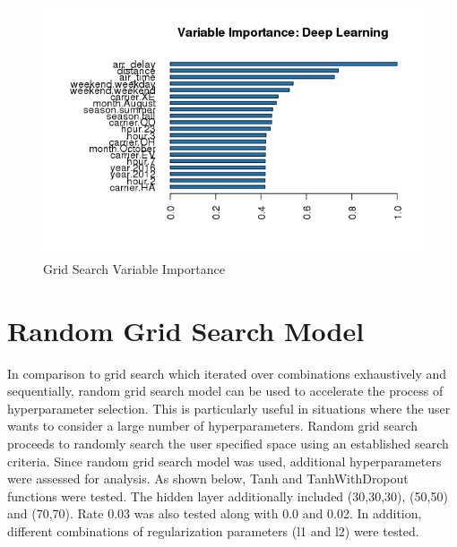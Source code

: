 \documentclass[12pt,twoside]{amherstthesis}
\begin{document}
  \begin{figure}[htbp]
  \centering
  \includegraphics[scale = 1,angle = 0]{figure/VarImportDeep-3.png}
  \caption[Grid Search Variable Importance]{\normalsize{Grid Search Variable Importance}}
  \label{fig:Hyarn89}
  \end{figure}
  
  \clearpage 
  
  \section{Random Grid Search Model}\label{random-grid-search-model}
  
  In comparison to grid search which iterated over combinations
  exhaustively and sequentially, random grid search model can be used to
  accelerate the process of hyperparameter selection. This is particularly
  useful in situations where the user wants to consider a large number of
  hyperparameters. Random grid search proceeds to randomly search the user
  specified space using an established search criteria. Since random grid
  search model was used, additional hyperparameters were assessed for
  analysis. As shown below, Tanh and TanhWithDropout functions were
  tested. The hidden layer additionally included (30,30,30), (50,50) and
  (70,70). Rate 0.03 was also tested along with 0.0 and 0.02. In addition,
  different combinations of regularization parameters (l1 and l2) were
  tested.
  
\end{document}
